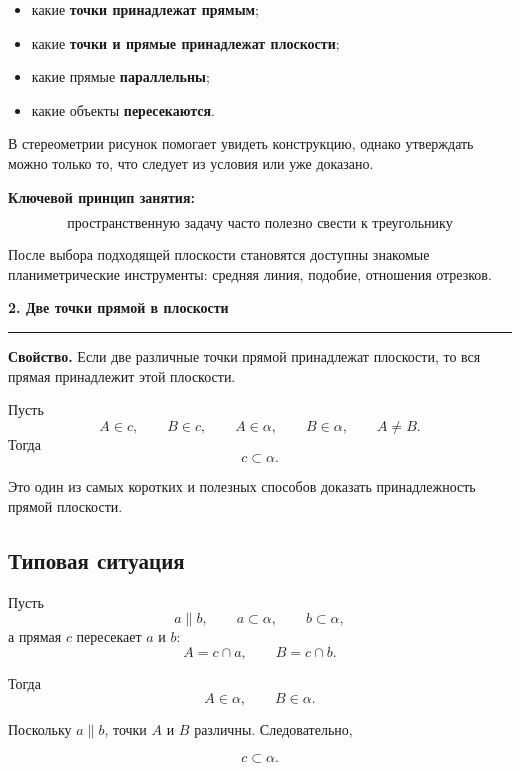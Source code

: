 \documentclass[a4paper,12pt]{article}
\newcommand{\lessonsection}[1]{%
  \vspace{0.4em}
  {\Large\bfseries\color{darkaccent}#1}\par
  \vspace{0.25em}
  {\color{lightaccent}\rule{\linewidth}{0.8pt}}
  \vspace{0.6em}
}
\newcommand{\key}[1]{\textbf{\color{darkaccent}#1}}
\begin{document}
\begin{itemize}[leftmargin=8mm,itemsep=2mm]
  \item какие \key{точки принадлежат прямым};
  \item какие \key{точки и прямые принадлежат плоскости};
  \item какие прямые \key{параллельны};
  \item какие объекты \key{пересекаются}.
\end{itemize}

В стереометрии рисунок помогает увидеть конструкцию, однако утверждать можно
только то, что следует из условия или уже доказано.

\medskip

\key{Ключевой принцип занятия:}

\[
\boxed{\text{пространственную задачу часто полезно свести к треугольнику}}
\]

После выбора подходящей плоскости становятся доступны знакомые планиметрические
инструменты: средняя линия, подобие, отношения отрезков.

\lessonsection{2. Две точки прямой в плоскости}

\key{Свойство.}
Если две различные точки прямой принадлежат плоскости, то вся прямая
принадлежит этой плоскости.

Пусть
\[
A\in c,\qquad B\in c,\qquad A\in\alpha,\qquad B\in\alpha,
\qquad A\ne B.
\]
Тогда
\[
c\subset\alpha.
\]

Это один из самых коротких и полезных способов доказать принадлежность прямой
плоскости.

\subsection*{\color{darkaccent}Типовая ситуация}

Пусть
\[
a\parallel b,\qquad a\subset\alpha,\qquad b\subset\alpha,
\]
а прямая \(c\) пересекает \(a\) и \(b\):
\[
A=c\cap a,\qquad B=c\cap b.
\]

Тогда
\[
A\in\alpha,\qquad B\in\alpha.
\]

Поскольку \(a\parallel b\), точки \(A\) и \(B\) различны. Следовательно,

\[
\boxed{c\subset\alpha}.
\]
\end{document}
